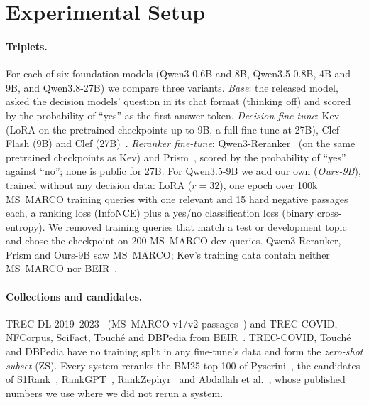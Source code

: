 \section{Experimental Setup}
\label{sec:setup}



\paragraph{Triplets.}
For each of six foundation models (Qwen3-0.6B and 8B, Qwen3.5-0.8B, 4B and 9B, and Qwen3.8-27B) we compare three
variants.
\emph{Base}: the released model, asked the decision models' question in its chat format (thinking off) and scored by
the probability of ``yes'' as the first answer token. \emph{Decision fine-tune}: Kev~\cite{Kev,KevCards} (LoRA on the
pretrained checkpoints up to 9B, a full fine-tune at 27B), Clef-Flash (9B) and Clef (27B)~\cite{Clef}.
\emph{Reranker fine-tune}: Qwen3-Reranker~\cite{Zhang2025Qwen3Embedding} (on the same pretrained checkpoints as Kev)
and Prism~\cite{Zhang2026Prism}, scored by the probability of ``yes'' against ``no''; none is public for 27B. For
Qwen3.5-9B we add our own (\emph{Ours-9B}), trained without any decision data: LoRA ($r=32$), one epoch over 100k
MS~MARCO training queries with one relevant and 15 hard negative passages each, a ranking loss (InfoNCE) plus a
yes/no classification loss (binary cross-entropy). We removed training queries that match a test or development
topic and chose the checkpoint on 200 MS~MARCO dev queries. Qwen3-Reranker, Prism and Ours-9B saw MS~MARCO; Kev's
training data contain neither MS~MARCO nor BEIR~\cite{KevCards}.

\paragraph{Collections and candidates.}
TREC DL 2019--2023~\cite{Craswell2020DL19,Craswell2021DL20,Craswell2021DL21,Craswell2022DL22,Craswell2023DL23}
(MS~MARCO v1/v2 passages~\cite{Nguyen2016MSMARCO}) and TREC-COVID, NFCorpus, SciFact, Touch\'e and DBPedia from
BEIR~\cite{Thakur2021BEIR}. TREC-COVID, Touch\'e and DBPedia have no training split in any fine-tune's data and form
the \emph{zero-shot subset} (ZS). Every system reranks the BM25 top-100 of Pyserini~\cite{Lin2021Pyserini}, the
candidates of S1Rank~\cite{S1Rank}, RankGPT~\cite{Sun2023RankGPT}, RankZephyr~\cite{Pradeep2023RankZephyr} and
Abdallah et al.~\cite{Abdallah2025HowGood}, whose published numbers we use where we did not rerun a system.

